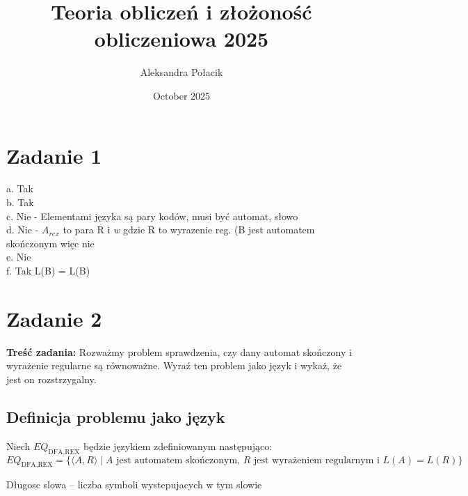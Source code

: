 \documentclass{article}
\title{Teoria obliczeń i złożoność obliczeniowa 2025}
\author{Aleksandra Połacik}
\date{October 2025}
\begin{document}
\maketitle

\section{Zadanie 1}
a. Tak \\
b. Tak \\
c. Nie - Elementami języka są pary kodów, musi być automat, słowo \\
d. Nie - $A_{rex}$ to para R i \textit{w} gdzie R to wyrazenie reg. (B jest automatem skończonym więc nie \\
e. Nie  \\
f. Tak L(B) = L(B) \\

\section*{Zadanie 2}

\textbf{Treść zadania:} Rozważmy problem sprawdzenia, czy dany automat skończony i wyrażenie regularne są równoważne. Wyraź ten problem jako język i wykaż, że jest on rozstrzygalny.

\subsection*{Definicja problemu jako język}

Niech $EQ_{\text{DFA,REX}}$ będzie językiem zdefiniowanym następująco:
$$
EQ_{\text{DFA,REX}} = \{ \langle A, R \rangle \mid A \text{ jest automatem skończonym, } R \text{ jest wyrażeniem regularnym i } L(A) = L(R) \}
$$

        \item {Długosc slowa} -- liczba symboli wystepujacych w tym slowie
\end{document}
